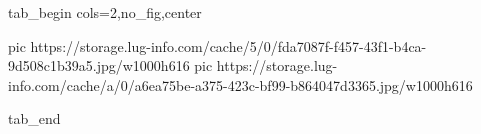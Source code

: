  
 
 
 
 


\ifcmt
  tab_begin cols=2,no_fig,center

     pic https://storage.lug-info.com/cache/5/0/fda7087f-f457-43f1-b4ca-9d508c1b39a5.jpg/w1000h616%
		 pic https://storage.lug-info.com/cache/a/0/a6ea75be-a375-423c-bf99-b864047d3365.jpg/w1000h616%

  tab_end
\fi

